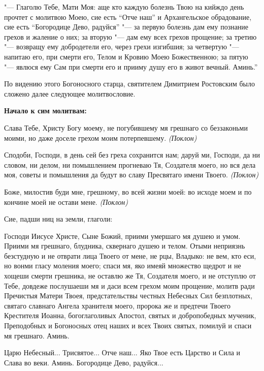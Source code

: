 "--- Глаголю Тебе, Мати Моя: аще кто каждую болезнь Твою на кийждо день прочтет с молитвою Моею, сие есть “Отче наш” и Архангельское обрадование, сие есть “Богородице Дево, радуйся” "--- за первую болезнь дам ему познание грехов и жаление о них; за вторую "--- дам ему всех грехов прощение; за третию "--- возвращу ему добродетели его, через грехи изгибшия; за четвертую "--- напитаю его, при смерти его, Телом и Кровию Моею Божественною; за пятую "--- явлюся ему Сам при смерти его и прииму душу его в живот вечный. Аминь.”


По видению этого Богоносного старца, святителем Димитрием Ростовским было сложено далее следующее молитвословие.


\medskip


\bfseries Начало к сим   молитвам:\normalfont{}\nopagebreak


Слава Тебе, Христу Богу моему, не погубившему мя грешнаго со беззаконьми моими, но даже доселе грехом моим потерпевшему. \itshape (Поклон)

\normalfont{}Сподоби, Господи, в день сей без греха сохранится нам; даруй ми, Господи, да ни словом, ни делом, ни помышлением прогневаю Тя, Создателя моего, но вся дела моя, советы и помышления да будут во славу Пресвятаго имени Твоего. \itshape (Поклон)

\normalfont{}Боже, милостив буди мне, грешному, во всей жизни моей: во исходе моем и по кончине моей не остави мене. \itshape (Поклон)

Сие, падши ниц на земли, глаголи:

\normalfont{}Господи Иисусе Христе, Сыне Божий, приими умершаго мя душею и умом. Приими мя грешнаго, блудника, сквернаго душею и телом. Отыми неприязнь безстудную и не отврати лица Твоего от мене, не рцы, Владыко: не вем, кто еси, но вонми гласу моления моего; спаси мя, яко имеяй множество щедрот и не хощеши смерти грешника, не оставлю же Тя, Создателя моего, и не отступлю от Тебе, довдеже послушаеши мя и даси всем грехом моим прощение, молитв ради Пречистыя Матери Твоея, предстательствы честных Небесных Сил безплотных, святаго славнаго Ангела хранителя моего, пророка же и предтечи Твоего Крестителя Иоанна, богоглаголивых Апостол, святых и добропобедных мученик, Преподобных и Богоносных отец наших и всех Твоих святых, помилуй и спаси мя грешнаго. Аминь.

Царю Небесный... Трисвятое... Отче наш... Яко Твое есть Царство и Сила и Слава во веки. Аминь. Богородице Дево, радуйся...


\medskip


